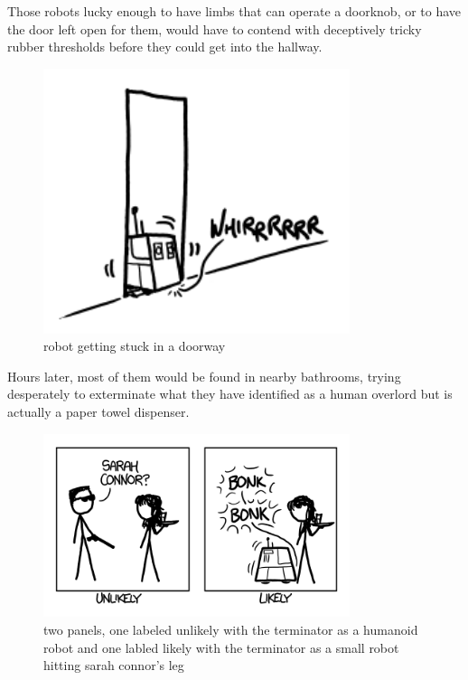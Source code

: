 {Those robots lucky enough to have limbs that can operate a doorknob, or to have the door left open for them, would have to contend with deceptively tricky rubber thresholds before they could get into the hallway.}

\begin{figure}[!htbp]
\centering
\includegraphics[scale=0.5, max width=0.8\textwidth]{imgs/a/5/robot_apocalypse_threshold.png}
\caption{robot getting stuck in a doorway}
\end{figure}

{Hours later, most of them would be found in nearby bathrooms, trying desperately to exterminate what they have identified as a human overlord but is actually a paper towel dispenser.}

\begin{figure}[!htbp]
\centering
\includegraphics[scale=0.5, max width=0.8\textwidth]{imgs/a/5/robot_apocalypse_comparison.png}
\caption{two panels, one labeled unlikely with the terminator as a humanoid robot and one labled likely with the terminator as a small robot hitting sarah connor's leg}
\end{figure}

